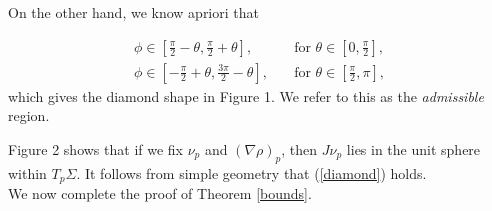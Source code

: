 \documentclass[11pt,reqno]{amsart}
\newcommand{\cs}{$\clubsuit$}
\newcommand{\singsupp}{\text{sing supp}}
\newcommand{\WF}{\text{WF}}
\theoremstyle{definition}
\begin{document}





\pagebreak


On the other hand, we know apriori that 

\begin{align}\label{diamond}
\phi\in[\frac{\pi}{2}-\theta,\frac{\pi}{2}+\theta],\quad&\text{for }\theta\in [0,\frac{\pi}{2}],\nonumber\\
\phi\in[-\frac{\pi}{2}+\theta,\frac{3\pi}{2}-\theta],\quad&\text{for }\theta\in [\frac{\pi}{2},\pi],
\end{align}
which gives the diamond shape in Figure 1. We refer to this as the {\em admissible} region.


Figure 2 shows that if we fix $\nu_p$ and $(\nabla\rho)_p$, then $J\nu_p$ lies in the unit sphere within $T_p\Sigma$. It follows from simple geometry that (\ref{diamond}) holds.\\


We now complete the proof of Theorem \ref{bounds}. 
\end{document}
